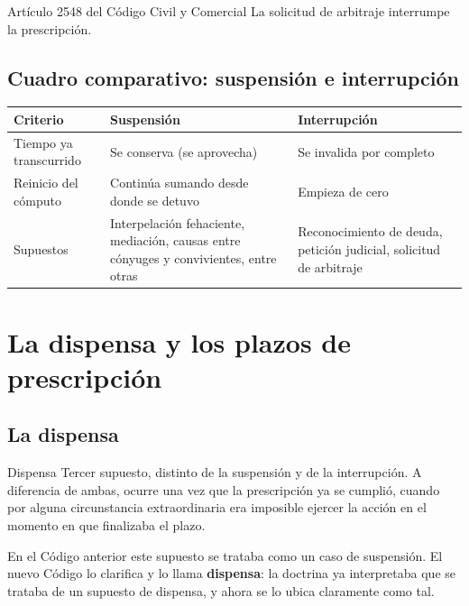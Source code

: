 \documentclass[12pt,oneside]{book}
\begin{document}
\begin{articulo}{Artículo 2548 del Código Civil y Comercial}
La solicitud de arbitraje interrumpe la prescripción.
\end{articulo}

\subsection{Cuadro comparativo: suspensión e interrupción}

\begin{table}[H]
\centering
\begin{tabularx}{\textwidth}{
    >{\raggedright\arraybackslash}p{3.3cm}
    >{\raggedright\arraybackslash}X
    >{\raggedright\arraybackslash}X
}
\toprule
\textbf{Criterio} & \textbf{Suspensión} & \textbf{Interrupción} \\
\midrule
Tiempo ya transcurrido & Se conserva (se aprovecha) & Se invalida por completo \\
\addlinespace
Reinicio del cómputo & Continúa sumando desde donde se detuvo & Empieza de cero \\
\addlinespace
Supuestos & Interpelación fehaciente, mediación, causas entre cónyuges y convivientes, entre otras & Reconocimiento de deuda, petición judicial, solicitud de arbitraje \\
\bottomrule
\end{tabularx}
\end{table}

\section{La dispensa y los plazos de prescripción}

\subsection{La dispensa}

\begin{definition}{Dispensa}
Tercer supuesto, distinto de la suspensión y de la interrupción. A diferencia de ambas, ocurre una vez que la prescripción ya se cumplió, cuando por alguna circunstancia extraordinaria era imposible ejercer la acción en el momento en que finalizaba el plazo.
\end{definition}

En el Código anterior este supuesto se trataba como un caso de suspensión. El nuevo Código lo clarifica y lo llama \textbf{dispensa}: la doctrina ya interpretaba que se trataba de un supuesto de dispensa, y ahora se lo ubica claramente como tal.
\end{document}
